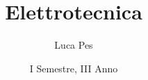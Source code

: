 \documentclass[12pt, a4paper]{article}
\begin{document}
\title{Elettrotecnica}
\author{Luca Pes}
\date{I Semestre, III Anno}
\maketitle

\newpage

\tableofcontents
\thispagestyle{fancy}





\end{document}
